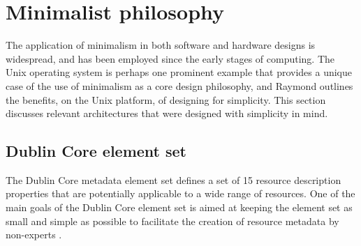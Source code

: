 \section{Minimalist philosophy}
\label{sec:background:simple-architectures}

The application of minimalism in both software and hardware designs is widespread, and has been employed since the early stages of computing. The Unix operating system is perhaps one prominent example that provides a unique case of the use of minimalism as a core design philosophy, and Raymond \citep{Raymond2004} outlines the benefits, on the Unix platform, of designing for simplicity. This section discusses relevant architectures that were designed with simplicity in mind.





\subsection[Dublin Core]{Dublin Core element set}
\label{sec:background:simple-architectures:dublin-core-element-set}

The Dublin Core metadata element set defines a set of 15 resource description properties that are potentially applicable to a wide range of resources. One of the main goals of the Dublin Core element set is aimed at keeping the element set as small and simple as possible to facilitate the creation of resource metadata by non-experts \citep{Hillmann2005}.

